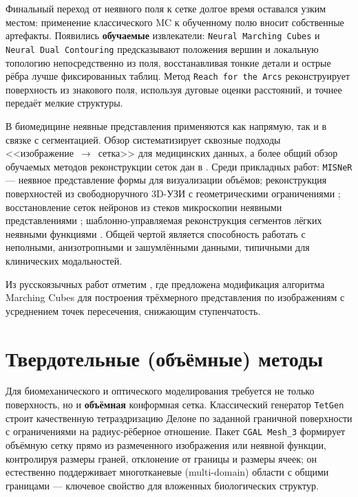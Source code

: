 \documentclass[a4paper,14pt]{article}
\begin{document}
Финальный переход от неявного поля к сетке долгое время оставался узким местом: применение классического MC к обученному полю вносит собственные артефакты. Появились \textbf{обучаемые} извлекатели: \texttt{Neural Marching Cubes} \cite{chen2021nmc} и \texttt{Neural Dual Contouring} \cite{chen2022ndc} предсказывают положения вершин и локальную топологию непосредственно из поля, восстанавливая тонкие детали и острые рёбра лучше фиксированных таблиц. Метод \texttt{Reach for the Arcs} \cite{sellan2024} реконструирует поверхность из знакового поля, используя дуговые оценки расстояний, и точнее передаёт мелкие структуры.

В биомедицине неявные представления применяются как напрямую, так и в связке с сегментацией. Обзор \cite{survey2026} систематизирует сквозные подходы <<изображение~$\to$~сетка>> для медицинских данных, а более общий обзор обучаемых методов реконструкции сеток дан в \cite{review2023}. Среди прикладных работ: \texttt{MISNeR} \cite{jin2024} --- неявное представление формы для визуализации объёмов; реконструкция поверхностей из свободноручного 3D-УЗИ с геометрическими ограничениями \cite{ultrasound2024}; восстановление сеток нейронов из стеков микроскопии неявными представлениями \cite{neuronal2025}; шаблонно-управляемая реконструкция сегментов лёгких неявными функциями \cite{pulmonary2025}. Общей чертой является способность работать с неполными, анизотропными и зашумлёнными данными, типичными для клинических модальностей.

Из русскоязычных работ отметим \cite{rus_marchingcubes}, где предложена модификация алгоритма Marching Cubes для построения трёхмерного представления по изображениям с усреднением точек пересечения, снижающим ступенчатость.

\section{Твердотельные (объёмные) методы}

Для биомеханического и оптического моделирования требуется не только поверхность, но и \textbf{объёмная} конформная сетка. Классический генератор \texttt{TetGen} \cite{si2015tetgen} строит качественную тетраэдризацию Делоне по заданной граничной поверхности с ограничениями на радиус-рёберное отношение. Пакет \texttt{CGAL Mesh\_3} формирует объёмную сетку прямо из размеченного изображения или неявной функции, контролируя размеры граней, отклонение от границы и размеры ячеек; он естественно поддерживает многотканевые (multi-domain) области с общими границами --- ключевое свойство для вложенных биологических структур.
\end{document}
